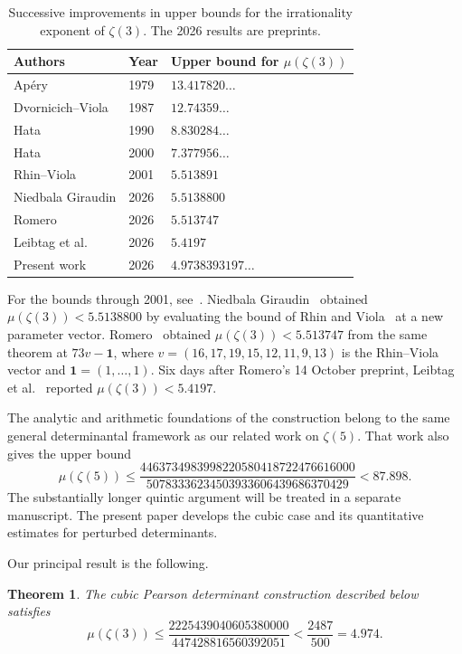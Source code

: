 \documentclass[11pt]{article}
\newtheorem{theorem}{Theorem}[section]
\theoremstyle{definition}\newtheorem{definition}[theorem]{Definition}
\theoremstyle{remark}\newtheorem{remark}[theorem]{Remark}
\begin{document}
\begin{table}[htbp]
\centering
\small
\caption{Successive improvements in upper bounds for the irrationality exponent of $\zeta(3)$. The 2026 results are preprints.}
\label{tab:history}
\begin{tabular}{@{}lll@{}}
\toprule
Authors & Year & Upper bound for $\mu(\zeta(3))$\\
\midrule
Ap\'ery & 1979 & $13.417820\ldots$\\
Dvornicich--Viola & 1987 & $12.74359\ldots$\\
Hata & 1990 & $8.830284\ldots$\\
Hata & 2000 & $7.377956\ldots$\\
Rhin--Viola & 2001 & $5.513891$\\
Niedbala Giraudin & 2026 & $5.5138800$\\
Romero & 2026 & $5.513747$\\
Leibtag et al. & 2026 & $5.4197$\\
Present work & 2026 & $4.9738393197\ldots$\\
\bottomrule
\end{tabular}
\end{table}

For the bounds through 2001, see~\cite{apery,dvornicichviola,hata1990,hata2000,rv}.
Niedbala Giraudin~\cite{giraudin} obtained $\mu(\zeta(3))<5.5138800$ by evaluating
the bound of Rhin and Viola~\cite[Theorem~5.1]{rv} at a new parameter vector.
Romero~\cite[Theorem~1]{romero} obtained $\mu(\zeta(3))<5.513747$ from the
same theorem at $73v-\mathbf{1}$, where $v=(16,17,19,15,12,11,9,13)$ is the
Rhin--Viola vector and $\mathbf{1}=(1,\ldots,1)$. Six days after Romero's
14 October preprint, Leibtag et al.~\cite{leibtag} reported $\mu(\zeta(3))<5.4197$.

The analytic and arithmetic foundations of the construction belong to the same general determinantal framework as our related work on $\zeta(5)$. That work also gives the upper bound
\[
\mu(\zeta(5))\le
\frac{4463734983998220580418722476616000}{50783336234503933606439686370429}
<87.898.
\]
The substantially longer quintic argument will be treated in a separate manuscript. The present paper develops the cubic case and its quantitative estimates for perturbed determinants.

Our principal result is the following.
\begin{theorem}\label{thm:main}
The cubic Pearson determinant construction described below satisfies
\[
 \boxed{\displaystyle
 \mu(\zeta(3))\le
 \frac{2225439040605380000}{447428816560392051}
 <\frac{2487}{500}=4.974.}
\]
\end{theorem}
\end{document}
